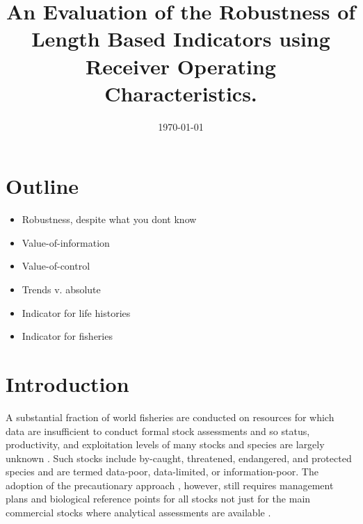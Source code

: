 \documentclass[12pt,doublespacing,a4paper]{ouparticle}
\begin{document}
\title{An Evaluation of the Robustness of Length Based Indicators using Receiver Operating Characteristics.}

\author{%
\address{Centre for Environmental Policy, Imperial College London, London SW7 1NE}
\and
{}
\address{GMIT}
\address{Marine Institute}
}

\abstract{
}

\date{\today}

\keywords{}
 
\maketitle

\newpage


\linenumbers
\linespread{2}

\section{Outline}
\begin{itemize}
 \item Robustness, despite what you dont know
 \item Value-of-information
 \item Value-of-control
 \item Trends v. absolute
 \item Indicator for life histories
 \item Indicator for fisheries
\end{itemize}


\section{Introduction}

A substantial fraction of world fisheries are conducted on resources for which data are insufficient to conduct formal stock assessments and so status, productivity, and exploitation levels of many stocks and species are largely unknown \citep{thorson2015introduction}. Such stocks include by-caught, threatened, endangered, and protected species and are termed data-poor, data-limited, or information-poor. The adoption of the precautionary approach \citep[PA,][]{garcia1996precautionary}, however, still requires management plans and biological reference points for all stocks not just for the main commercial stocks where analytical assessments are available \citep{sainsbury2003ref}. 
\end{document}
